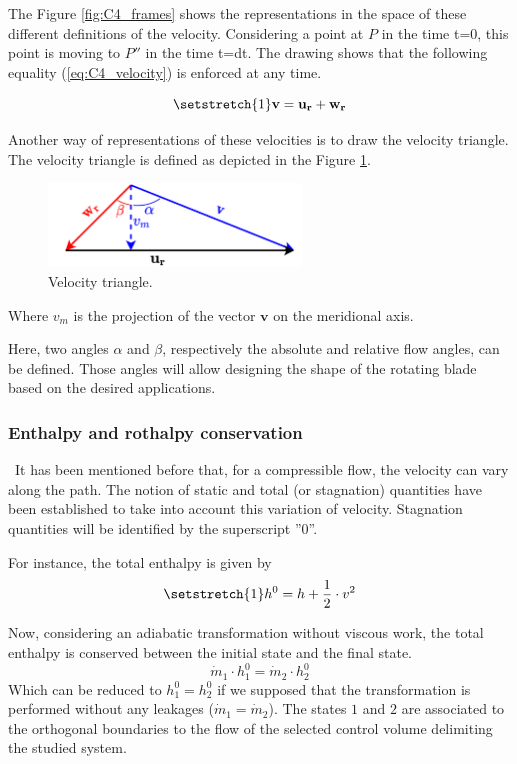 The Figure \ref{fig:C4_frames} shows the representations in the space of these different definitions of the velocity. Considering a point at $P$ in the time t=0, this point is moving to \(P''\) in the time t=dt.  
The drawing shows that the following equality (\ref{eq:C4_velocity}) is enforced at any time.

\begin{equation}
    \setstretch{1}
    \mathbf{v} = \mathbf{u_r} + \mathbf{w_r} \label{eq:C4_velocity}
\end{equation}

Another way of representations of these velocities is to draw the velocity triangle. The velocity triangle is defined as depicted in the Figure \ref{fig:C4_vtriang}.

\begin{figure}[h]
    \centering
    \includegraphics[width=0.6\textwidth]{Vtriangle.png}
    \caption{Velocity triangle.}
    \label{fig:C4_vtriang}
\end{figure}
Where $v_m$ is the projection of the vector $\mathbf{v}$ on the meridional axis.

Here, two angles $\alpha$ and $\beta$, respectively the absolute and relative flow angles, can be defined. Those angles will allow designing the shape of the rotating blade based on the desired applications. 

\subsubsection{Enthalpy and rothalpy conservation}
\quad\ It has been mentioned before that, for a compressible flow, the velocity can vary along the path. The notion of static and total (or stagnation) quantities have been established to take into account this variation of velocity. Stagnation quantities will be identified by the superscript ''0''.

For instance, the total enthalpy is given by
\begin{equation}
    \setstretch{1}
    h^0 = h + \frac{1}{2}\cdot v^2\label{eq:C4_h0}
\end{equation}

Now, considering an adiabatic transformation without viscous work, the total enthalpy is conserved between the initial state and the final state.
\begin{equation}
    \dot{m}_1\cdot h_1^0 = \dot{m}_2\cdot  h_2^0 \label{eq:C4_hcons}
\end{equation}
Which can be reduced to \(h_1^0 = h_2^0\) if we supposed that the transformation is performed without any leakages (\(\dot{m}_1=\dot{m}_2\)). The states \(1\) and \(2\) are associated to the orthogonal boundaries to the flow of the selected control volume delimiting the studied system.

